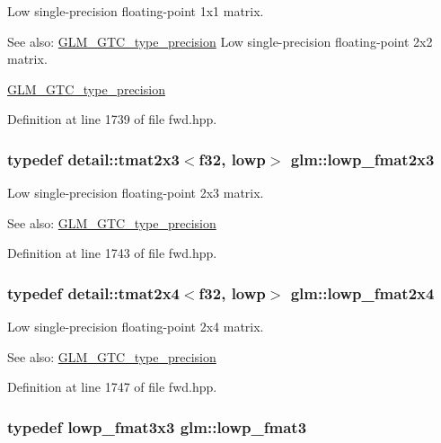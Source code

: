 Low single-precision floating-point 1x1 matrix. \begin{Desc}
\item[See also:]\hyperlink{group__gtc__type__precision}{GLM\_\-GTC\_\-type\_\-precision} Low single-precision floating-point 2x2 matrix. 

\hyperlink{group__gtc__type__precision}{GLM\_\-GTC\_\-type\_\-precision} \end{Desc}


Definition at line 1739 of file fwd.hpp.\hypertarget{group__gtc__type__precision_g01c5c29a6cee22c3e75de25c98dbecc9}{
\subsubsection[lowp\_\-fmat2x3]{\setlength{\rightskip}{0pt plus 5cm}typedef detail::tmat2x3$<$f32, lowp$>$ {\bf glm::lowp\_\-fmat2x3}}}
\label{group__gtc__type__precision_g01c5c29a6cee22c3e75de25c98dbecc9}


Low single-precision floating-point 2x3 matrix. \begin{Desc}
\item[See also:]\hyperlink{group__gtc__type__precision}{GLM\_\-GTC\_\-type\_\-precision} \end{Desc}


Definition at line 1743 of file fwd.hpp.\hypertarget{group__gtc__type__precision_g14b4460b2132fd3db19b53ec6f9353f2}{
\subsubsection[lowp\_\-fmat2x4]{\setlength{\rightskip}{0pt plus 5cm}typedef detail::tmat2x4$<$f32, lowp$>$ {\bf glm::lowp\_\-fmat2x4}}}
\label{group__gtc__type__precision_g14b4460b2132fd3db19b53ec6f9353f2}


Low single-precision floating-point 2x4 matrix. \begin{Desc}
\item[See also:]\hyperlink{group__gtc__type__precision}{GLM\_\-GTC\_\-type\_\-precision} \end{Desc}


Definition at line 1747 of file fwd.hpp.\hypertarget{group__gtc__type__precision_g88ae00cab6aae48d56700915c7799973}{
\subsubsection[lowp\_\-fmat3]{\setlength{\rightskip}{0pt plus 5cm}typedef lowp\_\-fmat3x3 {\bf glm::lowp\_\-fmat3}}}
\label{group__gtc__type__precision_g88ae00cab6aae48d56700915c7799973}


